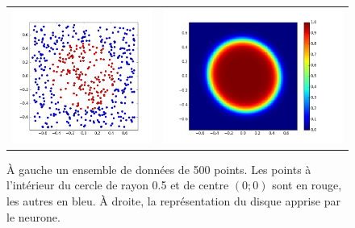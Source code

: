\begin{figure}[H]
\begin{center}
\begin{tabular}{cc}
\includegraphics[scale=0.35]{images/chapter1/disk_dataset.png} & \includegraphics[scale=0.35]{images/chapter1/disk_learned.png} \\
\end{tabular}
\caption{À gauche un ensemble de données de 500 points. Les points à l'intérieur du cercle de rayon 0.5 et de centre $(0; 0)$ sont en rouge, les autres en bleu. À droite, la représentation du disque apprise par le neurone.} 
\label{disque}
\end{center}
\end{figure}


